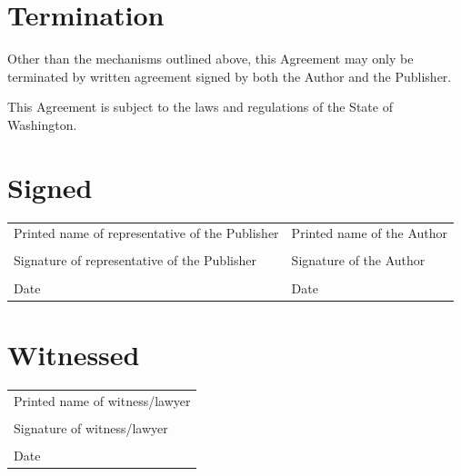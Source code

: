 \documentclass[12pt,letterpaper]{article}
\begin{document}
\section{Termination}

Other than the mechanisms outlined above, this Agreement may only be terminated by written agreement signed by both the Author and the Publisher.

This Agreement is subject to the laws and regulations of the State of Washington.

\newpage

\thispagestyle{final}

\section*{Signed}

\begin{tabular}{p{3in} p{3in}}
    \vspace{0.5in} & \\ \hline
    Printed name of representative of the Publisher & Printed name of the Author \\
    \vspace{0.5in} & \\ \hline
    Signature of representative of the Publisher & Signature of the Author \\
    \vspace{0.5in} & \\ \hline
    Date & Date \\
\end{tabular}

\section*{Witnessed}

\begin{tabular}{l}
    \vspace{0.5in} \\ \hline
    Printed name of witness/lawyer \\
    \vspace{0.5in} \\ \hline
    Signature of witness/lawyer \\
    \vspace{0.5in} \\ \hline
    Date \\
\end{tabular}
\end{document}
